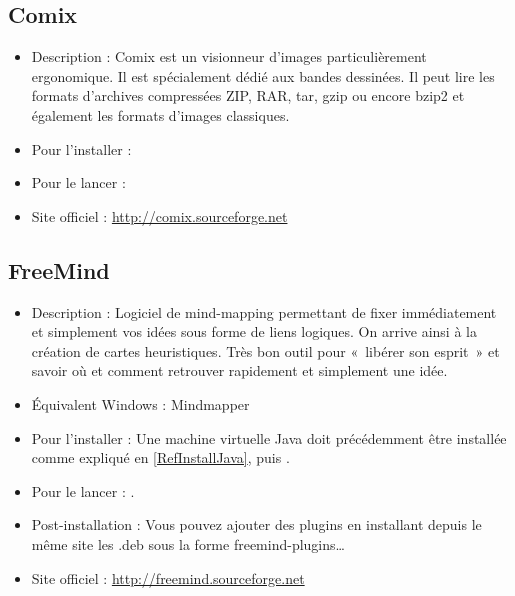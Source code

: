 \subsection{Comix}
\begin{itemize}
\begingroup
{}
\item Description : Comix est un visionneur d'images particulièrement ergonomique. Il est spécialement dédié aux bandes dessinées. Il peut lire les formats d'archives compressées ZIP, RAR, tar, gzip ou encore bzip2 et également les formats d'images classiques.{\par}
\item Pour l'installer : 
\item Pour le lancer : 
\item Site officiel : \url{http://comix.sourceforge.net}{\par}
\endgroup
\end{itemize}

\subsection{FreeMind}
\begin{itemize}
\begingroup
{}
\item Description : Logiciel de mind-mapping permettant de fixer immédiatement et simplement vos idées sous forme de liens logiques. On arrive ainsi à la création de cartes heuristiques. Très bon outil pour «~libérer son esprit~» et savoir où et comment retrouver rapidement et simplement une idée.{\par}
\endgroup
\item Équivalent Windows : Mindmapper{\par}
\item Pour l'installer : Une machine virtuelle Java doit précédemment être installée comme expliqué en \ref{RefInstallJava}, puis .{\par}
\item Pour le lancer : .{\par}
\item Post-installation : Vous pouvez ajouter des plugins en installant depuis le même site les .deb sous la forme freemind-plugins\ldots{}{\par}
\item Site officiel : \url{http://freemind.sourceforge.net}{\par}
\end{itemize}
